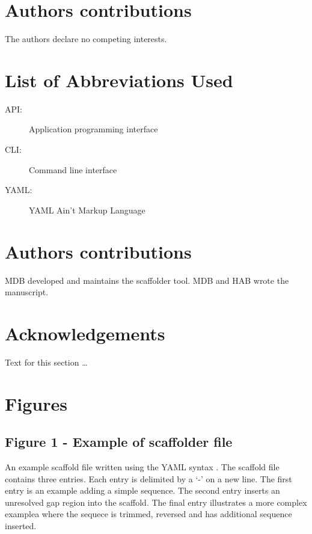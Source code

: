 \documentclass[10pt]{bmc_article}
\newenvironment{bmcformat}{\begin{raggedright}\baselineskip20pt\sloppy\setboolean{publ}{false}}{\end{raggedright}\baselineskip20pt\sloppy}
\begin{document}
\begin{bmcformat}
\clearpage

\section*{Authors contributions} %
  The authors declare no competing interests.

\section*{List of Abbreviations Used} %

  \begin{description}
    \item[API:] Application programming interface
    \item[CLI:] Command line interface
    \item[YAML:] YAML Ain't Markup Language\cite{yaml}
  \end{description}

\section*{Authors contributions} %

MDB developed and maintains the scaffolder tool. MDB and HAB wrote the
manuscript.

\section*{Acknowledgements} %
  Text for this section \ldots

\clearpage

{
   }     %


\clearpage

\section*{Figures} %

\subsection*{Figure 1 - Example of scaffolder file}

An example scaffold file written using the YAML syntax \cite{yaml}. The
scaffold file contains three entries. Each entry is delimited by a `-' on a new
line. The first entry is an example adding a simple sequence. The second entry
inserts an unresolved gap region into the scaffold. The final entry illustrates
a more complex examplea where the sequece is trimmed, reversed and has
additional sequence inserted. \pb

\end{bmcformat}
\end{document}
